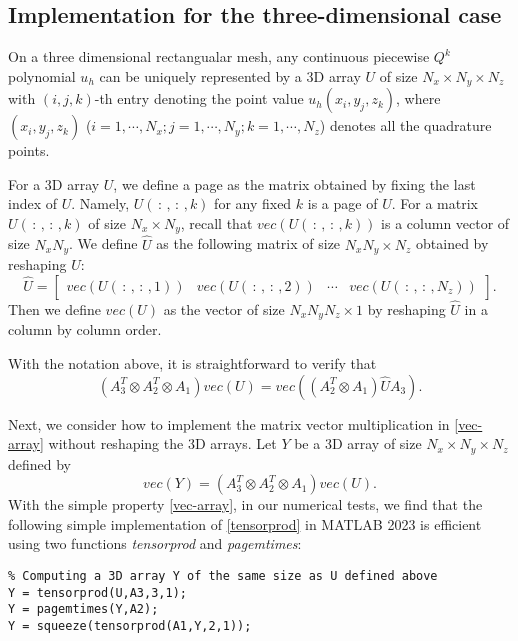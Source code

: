 \documentclass{article}
\begin{document}
\subsection{Implementation for the three-dimensional case}
\label{sec-3d}
On a three dimensional rectangualar mesh, any continuous piecewise $Q^k$ polynomial $u_h$
can be uniquely represented by a 3D array $U$ of size $N_x\times N_y\times N_z$ with $(i,j,k)$-th entry denoting the point value $u_h(x_i,y_j,z_k)$, where $(x_i, y_j, z_k)$ ($i=1,\cdots, N_x; j=1,\cdots, N_y; k=1,\cdots, N_z$) denotes all the quadrature points. 

For a 3D array $U$, we define a page as the matrix obtained by fixing the last index of $U$. Namely, $U(\,:\,,\,:\,,k)$ for any fixed $k$ is a page of $U$. For a matrix $U(\,:\,,\,:\,,k)$ of size $N_x\times N_y$, recall that $vec(U(\,:\,,\,:\,,k))$ is a column vector of size $N_xN_y$.
We define $\hat U$ as the following matrix of size $N_xN_y\times N_z$ obtained by reshaping $U$:
\[\hat U=\begin{bmatrix}
    vec(U(\,:\,,\,:\,,1)) & vec(U(\,:\,,\,:\,,2)) & \cdots & vec(U(\,:\,,\,:\,,N_z)) 
\end{bmatrix}.\]
Then we define $vec(U)$ as the vector of size $N_xN_yN_z\times 1$ by reshaping $\hat U$ in a column by column order. 


With the notation above, it is straightforward to verify that
\begin{equation}
    \label{vec-array}
     (A_3^T\otimes A_2^T\otimes A_1)vec(U) =vec((A_2^T\otimes A_1)\hat U A_3).
\end{equation}



Next, we consider how to implement the matrix vector multiplication in \eqref{vec-array}  without reshaping the 3D arrays.
Let $Y$ be a 3D array of size $N_x\times N_y\times N_z$ defined by
\begin{equation}
    \label{tensorprod}
    vec(Y)=(A_3^T\otimes A_2^T\otimes A_1)vec(U).
\end{equation}
With the simple property \eqref{vec-array}, in our numerical tests, we find that the following simple implementation of \eqref{tensorprod} in MATLAB 2023 is efficient using two functions {\it tensorprod} and {\it pagemtimes}:
\begin{lstlisting}
% Computing a 3D array Y of the same size as U defined above
Y = tensorprod(U,A3,3,1);
Y = pagemtimes(Y,A2);
Y = squeeze(tensorprod(A1,Y,2,1));
\end{lstlisting}
\end{document}
